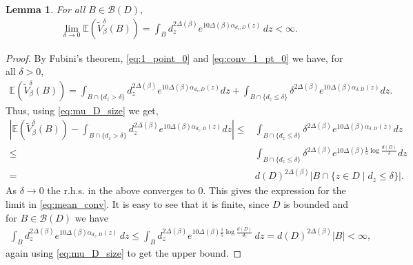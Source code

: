 \documentclass[a4paper, 11pt, reqno]{amsart}
\theoremstyle{definition} \newtheorem{defn}{Definition}[section]
\theoremstyle{remark} \newtheorem{rem}[defn]{Remark}
\theoremstyle{remark} \newtheorem*{rem*}{Remark}
\theoremstyle{plain} \newtheorem{thm}[defn]{Theorem}
\theoremstyle{plain} \newtheorem{lem}[defn]{Lemma}
\theoremstyle{plain} \newtheorem{prop}[defn]{Proposition}
\theoremstyle{plain} \newtheorem{cor}[defn]{Corollary}
\theoremstyle{remark} \newtheorem{exm}[defn]{\textbf{Example}}
\theoremstyle{remark} \newtheorem{exms}[defn]{\textbf{Examples}}
\theoremstyle{remark} \newtheorem*{bl}{}
\numberwithin{equation}{section} %
\newcommand{\mc}{\mathcal}
\newcommand{\C}{\mathbb{C}}
\newcommand{\E}{\mathbb{E}}
\begin{document}
	\begin{lem}\label{lem:mean_conv}
		For all $B \in \mc{B}(D)$, 
		\begin{align}\label{eq:mean_conv}
			\lim_{\delta \to 0} \E (\tilde{V}^{\delta}_{\beta}(B)) = \int_B d_z^{2\Delta(\beta)} e^{10\Delta(\beta) \alpha_{d_z, D}(z)} \, dz <\infty.
		\end{align} 
	\end{lem}
	
	\begin{proof}
		By Fubini's theorem, \eqref{eq:1_point_0} and \eqref{eq:conv_1_pt_0} we have, for all $\delta>0$, 
		\begin{align}
			\E (\tilde{V}^{\delta}_{\beta}(B)) 
			=  \int_{B \cap \{d_z > \delta\}} d_z^{2\Delta(\beta)} e^{10 \Delta(\beta) \alpha_{d_z, D}(z)} dz + \int_{B \cap \{d_z \le \delta\}} \delta^{2\Delta(\beta)} e^{10 \Delta(\beta) \alpha_{\delta, D}(z)} dz.
		\end{align}
		Thus, using \eqref{eq:mu_D_size} we get,
		\begin{align}
			\left| \E (\tilde{V}^{\delta}_{\beta}(B)) - \int_{B \cap \{d_z > \delta\}} d_z^{2\Delta(\beta)} e^{10 \Delta(\beta) \alpha_{d_z, D}(z)} dz \right| 			
			\le & \int_{B \cap \{d_z \le \delta\}} \delta^{2\Delta(\beta)} e^{10 \Delta(\beta) \alpha_{\delta, D}(z)} dz
			\nonumber \\
			\le & \int_{B \cap \{d_z \le \delta\}} \delta^{2\Delta(\beta)} e^{10 \Delta(\beta) \frac{1}{5} \log \frac{d(D)}{\delta}} dz
			\nonumber \\
			= & d(D)^{2\Delta(\beta)} |B \cap \{ z \in D \mid d_z \le \delta\}|.
		\end{align}
		As $\delta \to 0$ the r.h.s. in the above converges to $0$. This gives the expression for the limit in \eqref{eq:mean_conv}. It is easy to see that it is finite, since $D$ is bounded and for $B \in \mc{B}(D)$ we have
		\begin{align}
			\int_B d_z^{2\Delta(\beta)} e^{10\Delta(\beta) \alpha_{d_z, D}(z)} \, dz \le \int_B d_z^{2\Delta(\beta)} e^{10\Delta(\beta) \frac{1}{5} \log \frac{d(D)}{d_z}} \, dz = d(D)^{2\Delta(\beta)} |B| < \infty,
		\end{align}
         again using \eqref{eq:mu_D_size} to get the upper bound.
	\end{proof}
\end{document}
